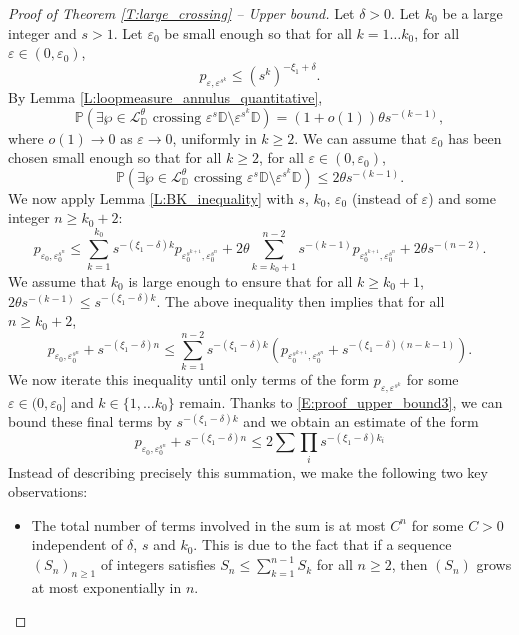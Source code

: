 \documentclass[11pt]{article}
\theoremstyle{remark}
\newcommand{\D}{\mathbb{D}}
\newcommand{\Lc}{\mathcal{L}}
\newcommand{\Prob}[1]{\mathbb{P} \left( #1 \right) }
\newcommand{\eps}{\varepsilon}
\numberwithin{equation}{section}
\begin{document}
\begin{proof}[Proof of Theorem \ref{T:large_crossing} -- Upper bound]
Let $\delta >0$.
Let $k_0$ be a large integer and $s>1$. Let $\eps_0$ be small enough so that for all $k=1 \dots k_0$, for all $\eps \in (0,\eps_0)$,
\begin{equation}
\label{E:proof_upper_bound3}
p_{\eps, \eps^{s^k}} \leq (s^k)^{-{\xi_1} + \delta}.
\end{equation}
By Lemma \ref{L:loopmeasure_annulus_quantitative},
\[
\Prob{ \exists \wp \in \Lc_\D^\theta \text{~crossing~} \eps^{s} \D \setminus \eps^{s^{k}} \D }
= (1+o(1)) \theta s^{-(k-1)},
\]
where $o(1) \to 0$ as $\eps \to 0$, uniformly in $k \geq 2$. We can assume that $\eps_0$ has been chosen small enough so that for all $k \geq 2$, for all $\eps \in (0,\eps_0)$,
\[
\Prob{ \exists \wp \in \Lc_\D^\theta \text{~crossing~} \eps^{s} \D \setminus \eps^{s^k} \D }
\leq 2 \theta s^{-(k-1)}.
\]
We now apply Lemma \ref{L:BK_inequality} with $s$, $k_0$, $\eps_0$ (instead of $\eps$) and some integer $n \geq k_0+2$:
\[
p_{\eps_0, \eps_0^{s^n}} \leq \sum_{k=1}^{k_0} s^{-({\xi_1}-\delta) k} p_{\eps_0^{s^{k+1}},\eps_0^{s^n}} + 2\theta \sum_{k=k_0+1}^{n-2} s^{-(k-1)} p_{\eps_0^{s^{k+1}},\eps_0^{s^n}} + 2\theta s^{-(n-2)}.
\]
We assume that $k_0$ is large enough to ensure that for all $k \geq k_0+1$, $2\theta s^{-(k-1)} \leq s^{-({\xi_1} - \delta)k}$. The above inequality then implies that for all $n \geq k_0+2$,
\begin{equation}
\label{E:proof_upper_bound1}
p_{\eps_0, \eps_0^{s^n}} + s^{-({\xi_1} - \delta)n} \leq \sum_{k=1}^{n-2} s^{-({\xi_1}-\delta) k} \left( p_{\eps_0^{s^{k+1}},\eps_0^{s^n}} + s^{-({\xi_1} - \delta) (n-k-1)} \right).
\end{equation}
We now iterate this inequality until only terms of the form $p_{\eps,\eps^{s^k}}$ for some $\eps \in (0,\eps_0]$ and $k \in \{1, \dots k_0 \}$ remain. Thanks to \eqref{E:proof_upper_bound3}, we can bound these final terms by $s^{-({\xi_1} - \delta)k}$ and we obtain an estimate of the form
\begin{equation}
\label{E:proof_upper_bound2}
p_{\eps_0, \eps_0^{s^n}} + s^{-({\xi_1} - \delta)n} \leq 2 \sum \prod_i s^{-({\xi_1}-\delta) k_i} 
\end{equation}
Instead of describing precisely this summation, we make the following two key observations:
\begin{itemize}
\item
The total number of terms involved in the sum is at most $C^n$ for some $C>0$ independent of $\delta$, $s$ and $k_0$. This is due to the fact that if a sequence $(S_n)_{n \geq 1}$ of integers satisfies $S_n \leq \sum_{k=1}^{n-1} S_k$ for all $n \geq 2$, then $(S_n)$ grows at most exponentially in $n$.

\end{itemize}
\end{proof}
\end{document}
